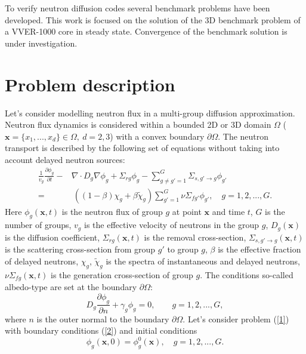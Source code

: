 \documentclass[runningheads,a4paper]{llncs}
\begin{document}
To verify neutron diffusion codes several benchmark problems have been developed. This work is focused on the solution of the 3D benchmark problem of a VVER-1000 core in steady state. Convergence of the benchmark solution is under investigation.

\section{Problem description}

Let's consider modelling neutron flux in a multi-group diffusion approximation. Neutron flux dynamics is considered within a bounded 2D or 3D domain  $\Omega$ ($\bm x = \{x_1, ..., x_d\} \in \Omega, \ d = 2,3$) with a convex boundary $\partial \Omega$. The neutron transport is described by the following set of equations without taking into account delayed neutron sources:
 \begin{equation}\label{1}
\begin{split}
 \frac{1}{v_g} \frac{\partial \phi_g}{\partial t} - & \nabla \cdot D_g \nabla \phi_g + \Sigma_{rg} \phi_g 
 - \sum_{g\neq g'=1}^{G} \Sigma_{s,g'\rightarrow g} \phi_{g'} \\
 =  & \ ( (1-\beta) \chi_g + \beta \widetilde{\chi}_g) \sum_{g'=1}^{G} \nu \Sigma_{fg'} \phi_{g'} , \quad 
 g = 1,2, ..., G .
\end{split}
\end{equation} 
Here $\phi_g(\bm x,t)$ is the neutron flux of group $g$ at point $\bm x$ and time $t$,
$G$ is the number of groups,
$v_g$ is the effective velocity of neutrons in the group $g$,
$D_g(\bm x)$ is the diffusion coefficient, $\Sigma_{rg}(\bm x,t)$ is the removal cross-section,
$\Sigma_{s,g'\rightarrow g}(\bm x,t)$ is the scattering cross-section from group $g'$ to group $g$,
$\beta$ is the effective fraction of delayed neutrons, $\chi_g$, $\widetilde{\chi}_g$  is the spectra of instantaneous and delayed neutrons, 
$\nu\Sigma_{fg}(\bm x,t)$ is the generation cross-section of group $g$.
The conditions so-called albedo-type are set at the boundary $\partial \Omega$:
\begin{equation}\label{2}
 D_g\frac{\partial \phi_g}{\partial n} + \gamma_g \phi_g = 0, \quad 
 \quad g = 1,2, ..., G ,
\end{equation}
where $n$ is the outer normal to the boundary $\partial \Omega$.
Let's consider problem (\ref{1}) with boundary conditions (\ref{2}) and initial conditions
\begin{equation}\label{3}
 \phi_g(\bm x,0) = \phi_g^0(\bm x), 
  \quad  g = 1,2, ..., G .
\end{equation} 
\end{document}

